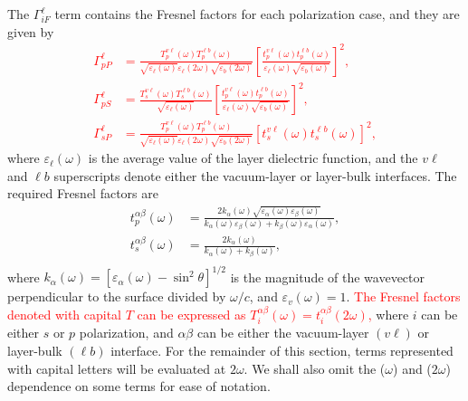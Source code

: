 \documentclass[prb,superscriptaddress,showpacs,twocolumn,letterpaper]{revtex4}
\newcommand{\correction}[1]{\textcolor{red}{#1}}
\begin{document}
The $\Gamma^{\ell}_{iF}$ term contains the Fresnel factors for each polarization
case, and they are given by
\correction{
\begin{align*}
\Gamma^{\ell}_{pP} &=
\frac{T^{v\ell}_{p}(\omega)T^{\ell b}_{p}(\omega)}
     {\sqrt{\varepsilon_{\ell}(\omega)}\varepsilon_{\ell}({2\omega})
     \sqrt{\varepsilon_{b}(2\omega)}}
\left[\frac{t^{v\ell}_{p}(\omega)t^{\ell b}_{p}(\omega)}
{\varepsilon_{\ell}(\omega)\sqrt{\varepsilon_{b}(\omega)}}\right]^{2},\\
\Gamma^{\ell}_{pS} &=
\frac{T^{v\ell}_{s}(\omega)T^{\ell b}_{s}(\omega)}
     {\sqrt{\varepsilon_{\ell}(\omega)}}
\left[\frac{t^{v\ell}_{p}(\omega)t^{\ell b}_{p}(\omega)}
      {\varepsilon_{\ell}(\omega)\sqrt{\varepsilon_{b}(\omega)}}\right]^{2},\\
\Gamma^{\ell}_{sP} &=
\frac{T_{p}^{v\ell}(\omega)T^{\ell b}_{p}(\omega)}
    {\sqrt{\varepsilon_{\ell}(\omega)}\varepsilon_{\ell}(2\omega)
    \sqrt{\varepsilon_{b}(2\omega)}}
\left[t_s^{v\ell}(\omega)t^{\ell b}_s(\omega)\right]^2,
\end{align*}} %
where $\varepsilon_{\ell}(\omega)$ is the average value of the layer dielectric
function, and the $v\ell$ and $\ell b$ superscripts denote either the
vacuum-layer or layer-bulk interfaces. The required Fresnel factors
are\cite{mizrahiJOSA88}
\begin{align*}
t_{p}^{\alpha\beta}(\omega) &=
\frac{2k_{\alpha}(\omega)
\sqrt{\varepsilon_{\alpha}(\omega)\varepsilon_{\beta}(\omega)}}
{k_{\alpha}(\omega)\varepsilon_{\beta}(\omega)+
k_{\beta}(\omega)\varepsilon_{\alpha}(\omega)},\\
t_s^{\alpha\beta}(\omega) &=
\frac{2k_{\alpha}(\omega)}{k_{\alpha}(\omega)+k_{\beta}(\omega)},\\
\end{align*}
where $k_{\alpha}(\omega) = [\varepsilon_{\alpha}(\omega)-\sin^2\theta]^{1/2}$
is the magnitude of the wavevector perpendicular to the surface divided by
$\omega/c$, and $\varepsilon_{v}(\omega) = 1$. 
\correction{The Fresnel factors denoted with capital $T$ can be expressed as
$T^{\alpha\beta}_{i}(\omega) = t^{\alpha\beta}_{i}(2\omega)$,} %
where $i$ can be either $s$ or $p$ polarization, and $\alpha\beta$ can be either
the vacuum-layer $(v\ell)$ or layer-bulk $(\ell b)$ interface. For the remainder
of this section, terms represented with capital letters will be evaluated at
$2\omega$. We shall also omit the ($\omega$) and ($2\omega$) dependence on some
terms for ease of notation.
\end{document}
